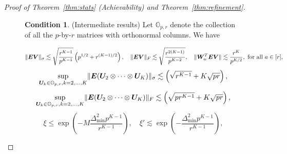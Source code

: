 \documentclass[journal]{IEEEtran}
\theoremstyle{definition}
\theoremstyle{definition}
\newtheorem{condition}{Condition}
\newcommand{\of}[1]{\left(#1\right)}
\newcounter{MYtempeqncnt}
\begin{document}
\begin{proof}[Proof of Theorem~\ref{thm:stats} (Achievability) and Theorem~\ref{thm:refinement}]
{\begin{figure}[t] 
\begin{condition}(Intermediate results) \label{cond:origin} Let $\mathbb{O}_{p, r}$ denote the collection of all the $p$-by-$r$ matrices with orthonormal columns. We have 
\setcounter{MYtempeqncnt}{\value{equation}} 

\setcounter{equation}{61} 
\begin{equation}\label{eq:cond1}
    \onormSize{}{\mE \mV}_\sigma \lesssim \sqrt{\frac{r^{K-1}}{p^{K-1}}} \of{ p ^{1/2}+ r^{(K-1)/2}}, \quad \onormSize{}{\mE \mV}_F \lesssim \sqrt{\frac{ r^{2(K-1)}}{p^{K-2}}},\quad \onormSize{}{ \mW_{a:}^T \mE \mV} \lesssim \frac{r^K}{p^{K/2}}, \text{  for all }a \in [r], 
\end{equation}
\begin{equation}\label{eq:cond2}
    \sup_{ \mU_k \in \mathbb{O}_{p, r}, k = 2,\ldots, K } \onormSize{}{ \mE (\mU_{2} \otimes \cdots \otimes \mU_K)}_\sigma \lesssim \of{ \sqrt{r^{K-1}} + K\sqrt{pr}},
\end{equation}
\begin{equation}\label{eq:cond3}
    \sup_{ \mU_k \in \mathbb{O}_{p, r}, k = 2,\ldots, K } \onormSize{}{ \mE (\mU_{2} \otimes \cdots \otimes \mU_K)}_F \lesssim \of{ \sqrt{pr^{K-1}} + K\sqrt{pr}},
\end{equation}
\begin{equation}\label{eq:cond_oracle}
    \xi \leq \exp\of{ - M \frac{\Delta_{\min}^2 p^{K-1}}{r^{K-1}}}, \quad  \xi' \lesssim \exp\of{ -  \frac{\Delta_{\min}^2 p^{K-1}}{r^{K-1}}},
\end{equation}


\end{condition}
\end{figure}}
\end{proof}
\end{document}
